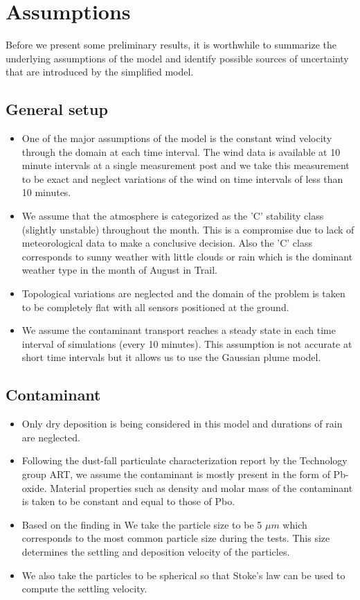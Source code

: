 \documentclass[11pt]{article}
\begin{document}
\section{Assumptions}
Before we present some preliminary results, it is 
worthwhile to summarize the underlying assumptions of the model and identify 
possible sources of uncertainty that are introduced by the simplified model.
\subsection{General setup}
\begin{itemize}
\item One of the major assumptions of the model is the constant wind velocity 
through the domain at each time interval. The wind data is available at 10 minute 
intervals at a single measurement post 
and we take this measurement to be exact and 
neglect variations of the wind on time intervals of less than 10 minutes.
\item We assume that the atmosphere is categorized as the 'C' stability class 
(slightly unstable) throughout the month. This is a compromise due to 
lack of meteorological data to make a conclusive decision. Also the 'C'
class corresponds to sunny weather with little clouds or rain which 
is the dominant weather type in the month of August in Trail. 
\item Topological variations are neglected and the domain of the problem 
is taken to be completely flat with all sensors positioned at the ground.
\item We assume the contaminant transport reaches a steady state in each 
time interval of simulations (every 10 minutes). This assumption is not 
accurate at short time 
intervals but it allows us to use the Gaussian plume model. 
\end{itemize}
\subsection{Contaminant}
\begin{itemize}
\item Only dry deposition is being considered in this model and durations of 
rain are neglected.
\item Following the dust-fall particulate characterization report \cite{EnvDustfallParticle} by the Technology group ART, we assume the contaminant is mostly 
present in the form of Pb-oxide. Material properties such as density and 
molar mass of the contaminant is taken to be constant and equal to those 
of Pbo. 
\item Based on the finding in \cite{EnvDustfallParticle} 
We take the particle size to be 5 $\mu m$ which corresponds to the 
most common particle size during the tests. This size determines the 
settling and deposition velocity of the particles. 
\item We also take the particles to be spherical so that Stoke's law 
can be used to compute the settling velocity.
\end{itemize}
\end{document}
